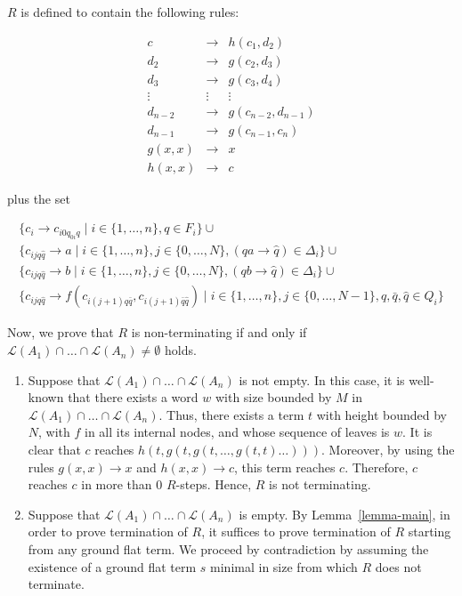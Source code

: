 \documentclass{LMCS}
\theoremstyle{plain}
\begin{document}
{$R$ is defined to contain the following rules:

$$
\begin{array}{rcl}
c&\to&h(c_1,d_2)\\
d_2&\to&g(c_2,d_3)\\
d_3&\to&g(c_3,d_4)\\
\vdots&\vdots&\vdots\\
d_{n-2}&\to&g(c_{n-2},d_{n-1})\\
d_{n-1}&\to&g(c_{n-1},c_{n})\\
g(x,x)&\to&x\\
h(x,x)&\to&c
\end{array}
$$

plus the set

$$
\begin{array}{l}
\{c_i\to c_{i0q_{0i}q}\;|\;i\in\{1,\ldots,n\},q\in F_i\}\cup\\
\{c_{ijq\hat{q}}\to a\;|\;i\in\{1,\ldots,n\},j\in\{0,\ldots,N\},
(qa\to\hat{q})\in \Delta_i\}\cup\\
\{c_{ijq\hat{q}}\to b\;|\;i\in\{1,\ldots,n\},j\in\{0,\ldots,N\},
(qb\to\hat{q})\in \Delta_i\}\cup\\
\{c_{ijq\hat{q}}\to f(c_{i(j+1)q\bar{q}},c_{i(j+1)\bar{q}\hat{q}})\;|\;
i\in\{1,\ldots,n\},j\in\{0,\ldots,N-1\},q,\bar{q},\hat{q}\in
Q_i\}
\end{array}
$$

Now, we prove that
$R$ is non-terminating if and only if
${\mathcal L}(A_1)\cap\ldots\cap{\mathcal
L}(A_n)\not=\emptyset$ holds.
\begin{enumerate}[$\bullet$]
\item Suppose that
${\mathcal L}(A_1)\cap\ldots\cap{\mathcal L}(A_n)$ is not empty.
In this case, it is well-known that
there exists a word $w$ with size bounded by $M$ in
${\mathcal L}(A_1)\cap\ldots\cap{\mathcal L}(A_n)$.
Thus, there exists a term $t$ with height bounded
by $N$, with $f$ in all its internal nodes, and
whose sequence of leaves is $w$.
It is clear that $c$ reaches
$h(t,g(t,g(t,\ldots,g(t,t)\ldots)))$.
Moreover, by using the rules $g(x,x)\to x$ and $h(x,x)\to c$,
this term reaches $c$. Therefore, $c$ reaches $c$ in more than
$0$ $R$-steps. Hence, $R$ is not terminating.

\item Suppose that 
${\mathcal L}(A_1)\cap\ldots\cap{\mathcal L}(A_n)$ is empty.
By Lemma~\ref{lemma-main}, in order to prove termination of $R$,
it suffices to prove termination of $R$ starting from any ground flat term.
We proceed by contradiction by assuming the existence of
a ground flat term $s$ minimal in size from which $R$ does not terminate.


\end{enumerate}}
\end{document}
